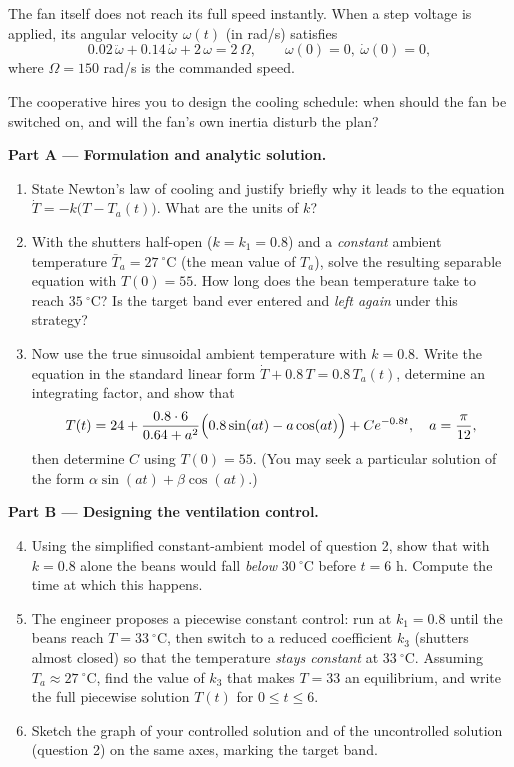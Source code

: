 \documentclass[11pt]{article}
\newcommand{\cle}[1]{{\popxbold\color{popdark}#1}}
\newcounter{popsec}
\newcounter{popsub}
\newcommand{\courssub}[1]{%
  \stepcounter{popsub}%
  \par\vspace{9pt}\noindent{\popxbold\fontsize{11.5}{13}\selectfont\color{popink}{\color{poporange}\thepopsec.\thepopsub}\hspace{6pt}#1}\par\nopagebreak\vspace{4pt}
}
\begin{document}
The fan itself does not reach its full speed instantly. When a step voltage is applied, its angular velocity $\omega(t)$ (in rad/s) satisfies
\[
0.02\,\ddot{\omega}+0.14\,\dot{\omega}+2\,\omega=2\,\Omega,
\qquad \omega(0)=0,\ \dot{\omega}(0)=0,
\]
where $\Omega=150$ rad/s is the commanded speed.

The cooperative hires you to design the cooling schedule: when should the fan be switched on, and will the fan's own inertia disturb the plan?

\courssub{Tasks}

\textbf{Part A — Formulation and analytic solution.}
\begin{enumerate}
\item State Newton's law of cooling and justify briefly why it leads to the equation
$\dot{T}=-k\bigl(T-T_a(t)\bigr)$. What are the units of $k$?
\item With the shutters half-open ($k=k_1=0.8$) and a \emph{constant} ambient temperature $\bar T_a=27\ ^{\circ}\mathrm{C}$ (the mean value of $T_a$), solve the resulting separable equation with $T(0)=55$. How long does the bean temperature take to reach $35\ ^{\circ}\mathrm{C}$? Is the target band ever entered and \emph{left again} under this strategy?
\item Now use the true sinusoidal ambient temperature with $k=0.8$. Write the equation in the standard linear form $\dot{T}+0.8\,T=0.8\,T_a(t)$, determine an integrating factor, and show that
\[
T(t)=24+\frac{0.8\cdot 6}{0.64+a^2}\Bigl(0.8\sin(at)-a\cos(at)\Bigr)+C e^{-0.8t},
\quad a=\frac{\pi}{12},
\]
then determine $C$ using $T(0)=55$. (You may seek a particular solution of the form $\alpha\sin(at)+\beta\cos(at)$.)
\end{enumerate}

\textbf{Part B — Designing the ventilation control.}
\begin{enumerate}
\setcounter{enumi}{3}
\item Using the simplified constant-ambient model of question 2, show that with $k=0.8$ alone the beans would fall \emph{below} $30\ ^{\circ}\mathrm{C}$ before $t=6$ h. Compute the time at which this happens.
\item The engineer proposes a \cle{piecewise constant control}: run at $k_1=0.8$ until the beans reach $T=33\ ^{\circ}\mathrm{C}$, then switch to a reduced coefficient $k_3$ (shutters almost closed) so that the temperature \emph{stays constant} at $33\ ^{\circ}\mathrm{C}$. Assuming $T_a\approx 27\ ^{\circ}\mathrm{C}$, find the value of $k_3$ that makes $T=33$ an equilibrium, and write the full piecewise solution $T(t)$ for $0\le t\le 6$.
\item Sketch the graph of your controlled solution and of the uncontrolled solution (question 2) on the same axes, marking the target band.
\end{enumerate}
\end{document}
